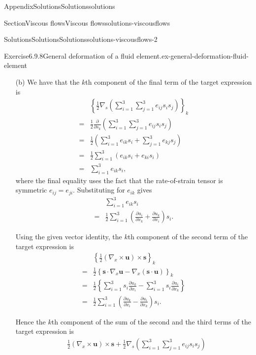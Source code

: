 \documentclass[oneside,10pt,]{book}
\numberwithin{equation}{section}
\newcommand{\pd}[2]{\frac{\partial#1}{\partial#2}}
\newcommand{\bs}{\boldsymbol{s}}
\newcommand{\bu}{\boldsymbol{u}}
\begin{document}
\begin{appendixptx}{Appendix}{Solutions}{}{Solutions}{}{}{solutions}
\begin{sectionptx}{Section}{Viscous flows}{}{Viscous flows}{}{}{solutions-viscousflows}
\begin{solutions-subsection-numberless}{Solutions}{Solutions}{}{Solutions}{}{}{solutions-viscousflows-2}
\begin{divisionsolution}{Exercise}{6.9.8}{General deformation of a fluid element.}{ex-general-deformation-fluid-element}
\begin{enumerate}[font=\bfseries,label=(\alph*),ref=\alph*]
\begin{equation*}
\bu_Q=\bu_P+\left(\bs\cdot\nabla\right)\bu
+\frac{1}{2!}\left(\bs\cdot\nabla\right)^2\bu
+\frac{1}{3!}\left(\bs\cdot\nabla\right)^3\bu+\cdots.
\end{equation*}
Since \(Q\) is a nearby point to \(P\), the higher order terms in \(\bs\) are negligible, and hence we have%
\begin{equation*}
\bu_Q=\bu_P+(\bs\cdot\nabla)\bu,
\end{equation*}
as required.%
\item[(b)]\noindent\hypertarget{ex-general-deformation-fluid-element-4-2-main}{}We have that the \(k\)th component of the final term of the target expression is%
\begin{align*}
&\left\{\frac12\nabla_s(\sum_{i=1}^3\sum_{j=1}^3e_{ij}s_is_j)\right\}_k\\
=&\frac12\pd{}{s_k}(\sum_{i=1}^3\sum_{j=1}^3e_{ij}s_is_j)\\
=&\frac12(\sum_{i=1}^3e_{ik}s_i+\sum_{j=1}^3e_{kj}s_j)\\
=&\frac12\sum_{i=1}^3(e_{ik}s_i+e_{ki}s_i)\\
=&\sum_{i=1}^3e_{ik}s_i,
\end{align*}
where the final equality uses the fact that the rate-of-strain tensor is symmetric \(e_{ij}=e_{ji}\). Substituting for \(e_{ik}\) gives%
\begin{align*}
&\sum_{i=1}^3e_{ik}s_i\\
=&\frac12\sum_{i=1}^3\left(\pd{u_i}{x_k}+\pd{u_k}{x_i}\right)s_i.
\end{align*}
%
\par
Using the given vector identity, the \(k\)th component of the second term of the target expression is%
\begin{align*}
&\left\{\frac12(\nabla_x\times\bu)\times\bs\right\}_k\\
=&\frac12\left\{\bs\cdot\nabla_x\bu-\nabla_x(\bs\cdot\bu)\right\}_k\\
=&\frac12\left\{\sum_{i=1}^3s_i\pd{u_k}{x_i}
-\sum_{i=1}^3s_i\pd{u_i}{x_k}\right\}\\
=&\frac12\sum_{i=1}^3\left(\pd{u_k}{x_i}-\pd{u_i}{x_k}\right)s_i.
\end{align*}
%
\par
Hence the \(k\)th component of the sum of the second and the third terms of the target expression is%
\begin{align*}
&\frac12(\nabla_x\times\bu)\times\bs
+\frac12\nabla_s(\sum_{i=1}^3\sum_{j=1}^3e_{ij}s_is_j)\\

\end{align*}
\end{enumerate}
\end{divisionsolution}
\end{solutions-subsection-numberless}
\end{sectionptx}
\end{appendixptx}
\end{document}
